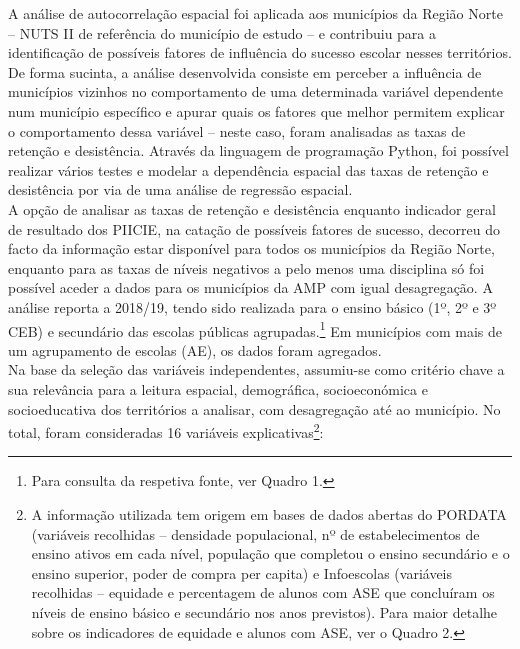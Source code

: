 \documentclass[
]{book}
\begin{document}
A análise de autocorrelação espacial foi aplicada aos municípios da Região Norte -- NUTS II de referência do município de estudo -- e contribuiu para a identificação de possíveis fatores de influência do sucesso escolar nesses territórios. De forma sucinta, a análise desenvolvida consiste em perceber a influência de municípios vizinhos no comportamento de uma determinada variável dependente num município específico e apurar quais os fatores que melhor permitem explicar o comportamento dessa variável -- neste caso, foram analisadas as taxas de retenção e desistência. Através da linguagem de programação Python, foi possível realizar vários testes e modelar a dependência espacial das taxas de retenção e desistência por via de uma análise de regressão espacial.\\
A opção de analisar as taxas de retenção e desistência enquanto indicador geral de resultado dos PIICIE, na catação de possíveis fatores de sucesso, decorreu do facto da informação estar disponível para todos os municípios da Região Norte, enquanto para as taxas de níveis negativos a pelo menos uma disciplina só foi possível aceder a dados para os municípios da AMP com igual desagregação. A análise reporta a 2018/19, tendo sido realizada para o ensino básico (1º, 2º e 3º CEB) e secundário das escolas públicas agrupadas.\footnote{Para consulta da respetiva fonte, ver Quadro 1.} Em municípios com mais de um agrupamento de escolas (AE), os dados foram agregados.\\
Na base da seleção das variáveis independentes, assumiu-se como critério chave a sua relevância para a leitura espacial, demográfica, socioeconómica e socioeducativa dos territórios a analisar, com desagregação até ao município. No total, foram consideradas 16 variáveis explicativas\footnote{A informação utilizada tem origem em bases de dados abertas do PORDATA (variáveis recolhidas -- densidade populacional, nº de estabelecimentos de ensino ativos em cada nível, população que completou o ensino secundário e o ensino superior, poder de compra per capita) e Infoescolas (variáveis recolhidas -- equidade e percentagem de alunos com ASE que concluíram os níveis de ensino básico e secundário nos anos previstos).
  Para maior detalhe sobre os indicadores de equidade e alunos com ASE, ver o Quadro 2.}:
\end{document}
